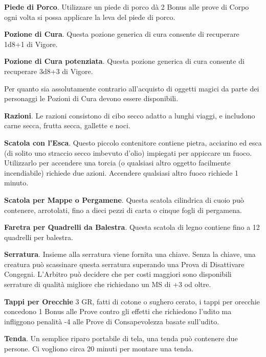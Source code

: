 \documentclass[12pt,a4paper,twoside,openany]{book}
\begin{document}
\begin{multicols}{2}
\textbf{Piede di Porco}. Utilizzare un piede di porco dà 2 Bonus alle prove di Corpo ogni volta si possa applicare la leva del piede di porco.

\textbf{Pozione di Cura}. Questa pozione generica di cura consente di recuperare 1d8+1 di Vigore.

\textbf{Pozione di Cura potenziata}. Questa pozione generica di cura consente di recuperare 3d8+3 di Vigore.

\begin{changemargin}{0.3cm}{0.3cm}\begin{narratore} Per quanto sia assolutamente contrario all'acquisto di oggetti magici da parte dei personaggi le Pozioni di Cura devono essere disponibili.
\end{narratore}\end{changemargin}

\textbf{Razioni}. Le razioni consistono di cibo secco adatto a lunghi viaggi, e includono carne secca, frutta secca, gallette e noci.

\textbf{Scatola con l’Esca}. Questo piccolo contenitore contiene pietra, acciarino ed esca (di solito uno straccio secco imbevuto d’olio) impiegati per appiccare un fuoco. Utilizzarlo per accendere una torcia (o qualsiasi altro oggetto facilmente incendiabile) richiede due azioni. Accendere qualsiasi altro fuoco richiede 1 minuto.

\textbf{Scatola per Mappe o Pergamene}. Questa scatola cilindrica di cuoio può contenere, arrotolati, fino a dieci pezzi di carta o cinque fogli di pergamena.

\textbf{Faretra per Quadrelli da Balestra}. Questa scatola di legno contiene fino a 12 quadrelli per balestra.

\textbf{Serratura}. Insieme alla serratura viene fornita una chiave. Senza la chiave, una creatura può scassinare questa serratura superando una Prova di Disattivare Congegni. L'Arbitro può decidere che per costi maggiori sono disponibili serrature di qualità migliore che richiedano un MS di +3 od oltre.

\textbf{Tappi per Orecchie} 3 GR, fatti di cotone o sughero cerato, i tappi per orecchie concedono 1 Bonus alle Prove contro gli effetti che richiedono l'udito ma infliggono penalità -4 alle Prove di Consapevolezza basate sull'udito.

\textbf{Tenda}. Un semplice riparo portabile di tela, una tenda può contenere due persone. Ci vogliono circa 20 minuti per montare una tenda.


\end{multicols}
\end{document}
